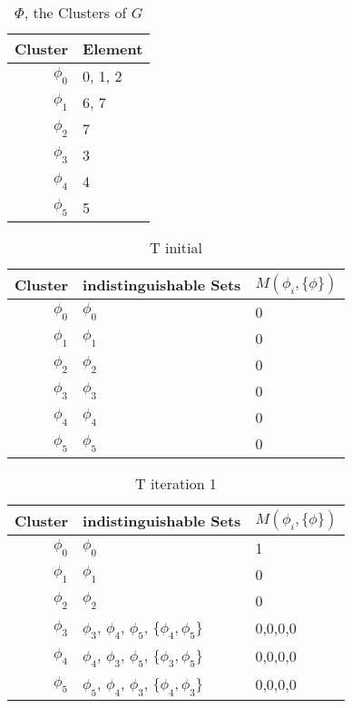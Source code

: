 \documentclass{article}
\begin{document}
				\begin{table}[h!]
				  \begin{center}
				    \caption{$\Phi$, the Clusters of $G$}
				    \label{tab:table1}
				    \begin{tabular}{r|l}
				      Cluster & Element\\
				      \hline
				      $\phi_0$ & 0, 1, 2\\
				      $\phi_1$ & 6, 7\\
				      $\phi_2$ & 7\\
				      $\phi_3$ & 3\\
				      $\phi_4$ & 4\\
				      $\phi_5$ & 5\\
				    \end{tabular}
				  \end{center}
				\end{table}


				\begin{table}[h!]
				  \begin{center}
				    \caption{T initial}
				    \label{tab:table2}
				    \begin{tabular}{r|l|l}
				      Cluster & indistinguishable Sets & $M(\phi_i, \{\phi\})$\\
				      \hline
				      $\phi_0$ & $\phi_0$ & 0\\
				      $\phi_1$ & $\phi_1$ & 0\\
				      $\phi_2$ & $\phi_2$ & 0\\
				      $\phi_3$ & $\phi_3$ & 0\\
				      $\phi_4$ & $\phi_4$ & 0\\
				      $\phi_5$ & $\phi_5$ & 0\\
				    \end{tabular}
				  \end{center}
				\end{table}


				\begin{table}[h!]
				  \begin{center}
				    \caption{T iteration 1}
				    \label{tab:table3}
				    \begin{tabular}{r|l|l}
				      Cluster & indistinguishable Sets & $M(\phi_i, \{\phi\})$\\
				      \hline
				      $\phi_0$ & $\phi_0$ & 1\\
				      $\phi_1$ & $\phi_1$ & 0\\
				      $\phi_2$ & $\phi_2$ & 0\\
				      $\phi_3$ & $\phi_3$, $\phi_4$, $\phi_5$, $\{\phi_4,\phi_5\}$ & 0,0,0,0\\
				      $\phi_4$ & $\phi_4$, $\phi_3$, $\phi_5$, $\{\phi_3,\phi_5\}$ & 0,0,0,0\\
				      $\phi_5$ & $\phi_5$, $\phi_4$, $\phi_3$, $\{\phi_4,\phi_3\}$ & 0,0,0,0\\
				    \end{tabular}
				  \end{center}
				\end{table}
\end{document}
